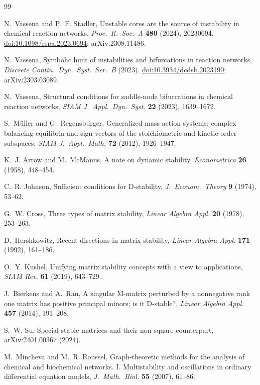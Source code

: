 \documentclass[11pt,a4paper]{article}
\theoremstyle{definition}
\theoremstyle{remark}
\begin{document}
\begin{thebibliography}{99}

N.~Vassena and P.~F. Stadler,
Unstable cores are the source of instability in chemical reaction networks,
\emph{Proc.\ R.\ Soc.\ A} \textbf{480} (2024), 20230694.
\href{https://doi.org/10.1098/rspa.2023.0694}{doi:10.1098/rspa.2023.0694}; arXiv:2308.11486.

N.~Vassena,
Symbolic hunt of instabilities and bifurcations in reaction networks,
\emph{Discrete Contin.\ Dyn.\ Syst.\ Ser.\ B} (2023).
\href{https://doi.org/10.3934/dcdsb.2023190}{doi:10.3934/dcdsb.2023190}; arXiv:2303.03089.

N.~Vassena,
Structural conditions for saddle-node bifurcations in chemical reaction networks,
\emph{SIAM J.\ Appl.\ Dyn.\ Syst.} \textbf{22} (2023), 1639--1672.

S.~M\"uller and G.~Regensburger,
Generalized mass action systems: complex balancing equilibria and sign vectors of the stoichiometric and kinetic-order subspaces,
\emph{SIAM J.\ Appl.\ Math.} \textbf{72} (2012), 1926--1947.

K.~J. Arrow and M.~McManus,
A note on dynamic stability,
\emph{Econometrica} \textbf{26} (1958), 448--454.

C.~R. Johnson,
Sufficient conditions for D-stability,
\emph{J.\ Econom.\ Theory} \textbf{9} (1974), 53--62.

G.~W. Cross,
Three types of matrix stability,
\emph{Linear Algebra Appl.} \textbf{20} (1978), 253--263.

D.~Hershkowitz,
Recent directions in matrix stability,
\emph{Linear Algebra Appl.} \textbf{171} (1992), 161--186.

O.~Y. Kushel,
Unifying matrix stability concepts with a view to applications,
\emph{SIAM Rev.} \textbf{61} (2019), 643--729.

J.~Bierkens and A.~Ran,
A singular M-matrix perturbed by a nonnegative rank one matrix has positive principal minors; is it D-stable?,
\emph{Linear Algebra Appl.} \textbf{457} (2014), 191--208.

S.~W. Su,
Special stable matrices and their non-square counterpart,
arXiv:2401.00367 (2024).

M.~Mincheva and M.~R. Roussel,
Graph-theoretic methods for the analysis of chemical and biochemical networks. I. Multistability and oscillations in ordinary differential equation models,
\emph{J.\ Math.\ Biol.} \textbf{55} (2007), 61--86.


\end{thebibliography}
\end{document}
